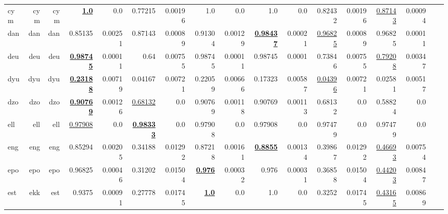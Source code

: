 \documentclass[11pt]{article}
\begin{document}
\begin{table*}[h]
{\begin{tabular}{lrrrrrrrrrrrrrrrr}
cym         & cym         & cym         & \textbf{\underline{1.0}}         & 0.0         & 0.77215         & 0.00196         & 1.0         & 0.0         & 1.0         & 0.0         & 0.82432         & 0.00196         & \underline{0.87143}         & 0.00094         \\
dan         & dan         & dan         & 0.85135         & 0.00251         & 0.87143         & 0.00089         & 0.91304         & 0.00129         & \textbf{\underline{0.98437}}         & 0.00021         & \underline{0.96825}         & 0.00089         & 0.96825         & 0.00011         \\
deu         & deu         & deu         & \textbf{\underline{0.98745}}         & 0.00011         & 0.64         & 0.00755         & 0.98745         & 0.00011         & 0.98745         & 0.0001         & 0.73846         & 0.00755         & \underline{0.79208}         & 0.00347         \\
dyu         & dyu         & dyu         & \textbf{\underline{0.23188}}         & 0.00719         & 0.04167         & 0.00721         & 0.22059         & 0.00666         & 0.17323         & 0.00587         & \underline{0.04396}         & 0.00721         & 0.02581         & 0.00517         \\
dzo         & dzo         & dzo         & \textbf{\underline{0.90769}}         & 0.00126         & \underline{0.68132}         & 0.0         & 0.90769         & 0.00118         & 0.90769         & 0.00113         & 0.68132         & 0.0         & 0.58824         & 0.0         \\
ell         & ell         & ell         & \underline{0.97908}         & 0.0         & \textbf{\underline{0.98333}}         & 0.0         & 0.97908         & 0.0         & 0.97908         & 0.0         & 0.97479         & 0.0         & 0.97479         & 0.0         \\
eng         & eng         & eng         & 0.85294         & 0.00205         & 0.34188         & 0.01292         & 0.87218         & 0.00161         & \textbf{\underline{0.8855}}         & 0.00134         & 0.39867         & 0.01292         & \underline{0.46693}         & 0.00754         \\
epo         & epo         & epo         & 0.96825         & 0.00046         & 0.31202         & 0.01504         & \textbf{\underline{0.976}}         & 0.00032         & 0.976         & 0.00031         & 0.36858         & 0.01504         & \underline{0.44203}         & 0.00847         \\
est         & ekk         & est         & 0.9375         & 0.00091         & 0.27778         & 0.01745         & \textbf{\underline{1.0}}         & 0.0         & 1.0         & 0.0         & 0.3252         & 0.01745         & \underline{0.43165}         & 0.00869         \\

\end{tabular}}
\end{table*}
\end{document}
